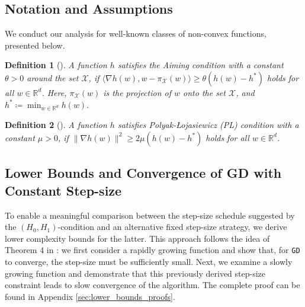 \documentclass[a4paper,11pt]{article}
\newcommand{\algname}[1]{\texttt{#1}}
\newcommand{\cX}{\mathcal X}
\newcommand{\R}{\mathbb{R}}
\newcommand{\1}{\mathbbm{1}}
\newcommand{\eqdef}{\coloneqq}
\theoremstyle{plain}
\newtheorem{definition}{Definition}[section]
\begin{document}
\subsection{Notation and Assumptions}

We conduct our analysis for well-known classes of non-convex functions, presented below.

\begin{definition}[\citet{liu2023aiming}]\label{asmp:aiming_condition}
    A function $h$ satisfies the Aiming condition with a constant $\theta > 0$ around the set $\cX$, if $\langle\nabla h(w), w - \pi_{\cX}(w) \rangle \ge \theta(h(w) - h^*)$ holds for all $w\in\R^d$. Here, $\pi_{\cX}(w)$ is the projection of $w$ onto the set $\cX$, and $h^*\eqdef \min_{w\in\R^d}h(w).$
\end{definition}


\begin{definition}[\citet{polyak1963gradient}]\label{asmp:pl_condition}
   A function $h$ satisfies Polyak-{\L}ojasiewicz  (PL) condition with a constant $\mu > 0$, if $\|\nabla h(w)\|^2 \ge 2\mu(h(w)-h^*)$ holds for all $w\in\R^d$.
\end{definition}

\subsection{Lower Bounds and Convergence of GD with Constant Step-size}

To enable a meaningful comparison between the step-size schedule suggested by the $(H_0, H_1)$-condition and an alternative fixed step-size strategy, we derive lower complexity bounds for the latter. This approach follows the idea of Theorem 4 in \cite{zhang2019gradient}: we first consider a rapidly growing function and show that, for \algname{GD} to converge, the step-size must be sufficiently small. Next, we examine a slowly growing function and demonstrate that this previously derived step-size constraint leads to slow convergence of the algorithm. The complete proof can be found in Appendix \ref{sec:lower_bounds_proofs}.
\end{document}
